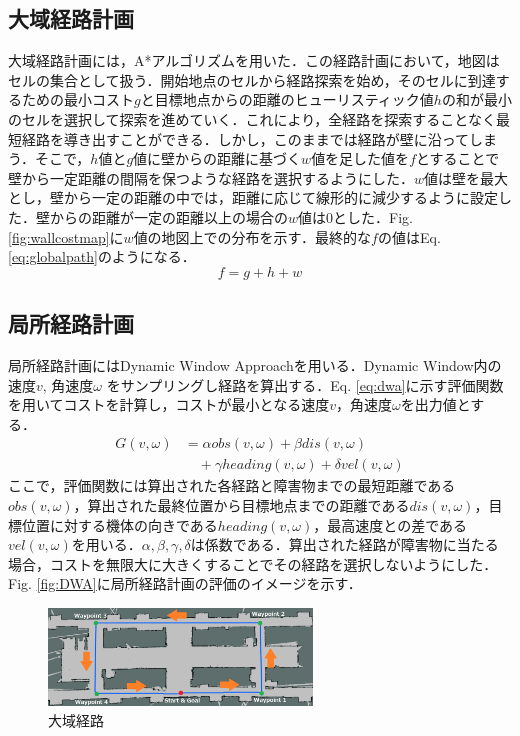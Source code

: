 \documentclass{jarticle}
\renewcommand{\%}{\textsf{\char`\%}}
\begin{document}
\subsection{大域経路計画}
大域経路計画には，A*アルゴリズムを用いた．この経路計画において，地図はセルの集合として扱う．開始地点のセルから経路探索を始め，そのセルに到達するための最小コスト$g$と目標地点からの距離のヒューリスティック値$h$の和が最小のセルを選択して探索を進めていく．これにより，全経路を探索することなく最短経路を導き出すことができる．しかし，このままでは経路が壁に沿ってしまう．そこで，$h$値と$g$値に壁からの距離に基づく$w$値を足した値を$f$とすることで壁から一定距離の間隔を保つような経路を選択するようにした．$w$値は壁を最大とし，壁から一定の距離の中では，距離に応じて線形的に減少するように設定した．壁からの距離が一定の距離以上の場合の$w$値は0とした．Fig. \ref{fig:wallcostmap}に$w$値の地図上での分布を示す．最終的な$f$の値はEq. \ref{eq:globalpath}のようになる．
\vspace{-3mm}
\begin{equation}
	f = g + h + w
	\label{eq:globalpath}
\end{equation}
\subsection{局所経路計画} 
局所経路計画にはDynamic Window Approachを用いる．Dynamic Window内の速度$v$, 角速度$\omega$ をサンプリングし経路を算出する．Eq. \ref{eq:dwa}に示す評価関数を用いてコストを計算し，コストが最小となる速度$v$，角速度$\omega$を出力値とする．
\vspace{-3mm}
\begin{equation}
	\begin{split}
		G(v, \omega) &= \alpha obs(v, \omega) + \beta dis(v, \omega)\\
		&\quad+ \gamma heading(v, \omega) + \delta vel(v, \omega) 
	    \label{eq:dwa}
	\end{split}
\end{equation}
ここで，評価関数には算出された各経路と障害物までの最短距離である$obs(v,\omega)$，算出された最終位置から目標地点までの距離である$dis(v,\omega)$，目標位置に対する機体の向きである$heading(v,\omega)$，最高速度との差である$vel(v, \omega)$を用いる．$α,β,γ,δ$は係数である．算出された経路が障害物に当たる場合，コストを無限大に大きくすることでその経路を選択しないようにした．Fig.  \ref{fig:DWA}に局所経路計画の評価のイメージを示す．
\begin{figure}
\begin{center}
	\includegraphics[width=7.0cm]{./picture/global_path.png}
\end{center}
\vspace{-3mm}
	\caption{大域経路}
	\label{fig:globalpath}
\end{figure}
\end{document}
